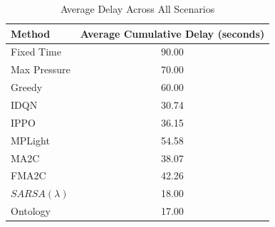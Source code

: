 \documentclass[letterpaper]{article} %
\begin{document}
\begin{table}[H]
\centering
\begin{tabular}{lc}
\hline
\textbf{Method} & \textbf{Average Cumulative Delay (seconds)} \\ \hline
Fixed Time      & 90.00\footnotemark[2] \\
Max Pressure    & 70.00\footnotemark[2] \\
Greedy          & 60.00\footnotemark[2] \\
IDQN            & 30.74                  \\
IPPO            & 36.15                  \\
MPLight         & 54.58                  \\
MA2C            & 38.07\footnotemark[1]                  \\
FMA2C           & 42.26                  \\
\(SARSA(\lambda)\)           & 18.00\footnotemark[2]                  \\
Ontology        & 17.00\footnotemark[2]                  \\ \hline
\end{tabular}
\caption{Average Delay Across All Scenarios}
\label{tab:avg_delay}
\end{table}
\end{document}
